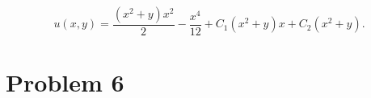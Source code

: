 \documentclass{eeleyes}
\begin{document}
\[
    u(x,y) = \frac{(x^2 + y) x^2}{2} - \frac{x^4}{12} + C_1(x^2 + y) x + C_2(x^2 + y)
.\]

\section*{Problem 6}
\end{document}
